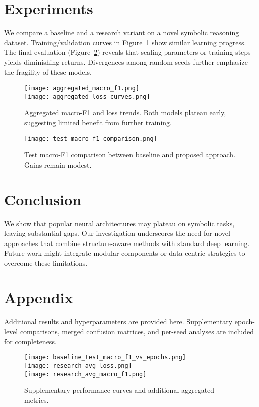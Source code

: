 \documentclass[11pt]{article}
\begin{document}
\section{Experiments}
We compare a baseline and a research variant on a novel symbolic reasoning dataset. Training/validation curves in Figure~\ref{fig:agg} show similar learning progress. The final evaluation (Figure~\ref{fig:test}) reveals that scaling parameters or training steps yields diminishing returns. Divergences among random seeds further emphasize the fragility of these models.

\begin{figure}[t]
  \centering
  \texttt{[image: aggregated\_macro\_f1.png]}\\
  \texttt{[image: aggregated\_loss\_curves.png]}
  \caption{Aggregated macro-F1 and loss trends. Both models plateau early, suggesting limited benefit from further training.}
  \label{fig:agg}
\end{figure}

\begin{figure}[t]
  \centering
  \texttt{[image: test\_macro\_f1\_comparison.png]}
  \caption{Test macro-F1 comparison between baseline and proposed approach. Gains remain modest.}
  \label{fig:test}
\end{figure}

\section{Conclusion}
We show that popular neural architectures may plateau on symbolic tasks, leaving substantial gaps. Our investigation underscores the need for novel approaches that combine structure-aware methods with standard deep learning. Future work might integrate modular components or data-centric strategies to overcome these limitations.



\clearpage
\appendix

\section{Appendix}
Additional results and hyperparameters are provided here. Supplementary epoch-level comparisons, merged confusion matrices, and per-seed analyses are included for completeness.

\begin{figure}[h!]
  \centering
  \texttt{[image: baseline\_test\_macro\_f1\_vs\_epochs.png]}\\
  \texttt{[image: research\_avg\_loss.png]}\\
  \texttt{[image: research\_avg\_macro\_f1.png]}
  \caption{Supplementary performance curves and additional aggregated metrics.}
\end{figure}
\end{document}
